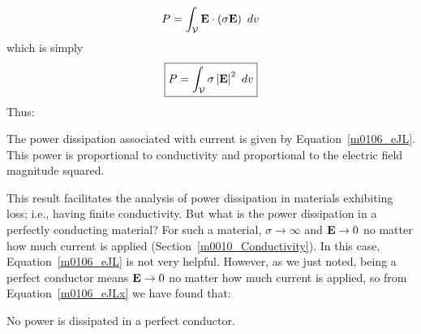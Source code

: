 %
\begin{equation}
P = \int_{\mathcal V} {\bf E} \cdot \left(\sigma{\bf E}\right)~dv
\end{equation}
%
which is simply
%
\begin{equation}
\boxed{
P = \int_{\mathcal V} \sigma \left|{\bf E}\right|^2~dv
}
\label{m0106_eJL}
\end{equation}
%
Thus:
%
\begin{mdframed}[backgroundcolor=yellow!20,nobreak=true] 
The power dissipation associated with current is given by Equation~\ref{m0106_eJL}. 
This power is proportional to conductivity and proportional to the electric field magnitude squared.
\end{mdframed}

This result facilitates the analysis of power dissipation in materials exhibiting loss; i.e., having finite conductivity.
But what is the power dissipation in a perfectly conducting material?  
For such a material, $\sigma\to\infty$ and ${\bf E}\to 0$ no matter how much current is applied (Section~\ref{m0010_Conductivity}).
In this case, Equation~\ref{m0106_eJL} is not very helpful.
However, as we just noted, being a perfect conductor means ${\bf E}\to 0$ no matter how much current is applied, so from Equation~\ref{m0106_eJLx} we have found that:
%
\begin{mdframed}[backgroundcolor=yellow!20,nobreak=true] 
No power is dissipated in a perfect conductor. 
\end{mdframed}

